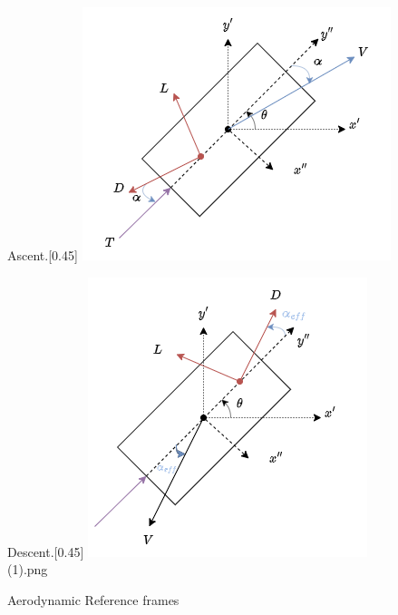\begin{figure}[H]
    \centering
    \begin{subcaptionbox}{Ascent.}[0.45\linewidth]
        {\includegraphics[width=\linewidth]{figures/LiteratureStudy/AerodynamicReference_ascent.png}}
        \label{fig:ascent_aero}
    \end{subcaptionbox}
    \hfill
    \begin{subcaptionbox}{Descent.}[0.45\linewidth]
        {\includegraphics[width=\linewidth]{figures/LiteratureStudy/AerodynamicReference_descent (1).png} (1).png}
        \label{fig:descent_aero}
    \end{subcaptionbox}
    \caption{Aerodynamic Reference frames}
    \label{fig:aero_reference_frames}
\end{figure}